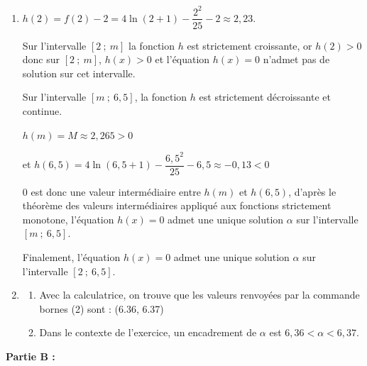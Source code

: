 \begin{enumerate}
$[2~;~6,5] \subset ]-1~;~x_1[$ donc $f$ est strictement croissante sur $[2~;~6,5]$.

\item $h(2) =f(2) - 2 = 4 \ln (2+1)-\dfrac{2^{2}}{25}-2 \approx 2,23$.

Sur l'intervalle $[2~;~m]$ la fonction $h$ est strictement croissante, or $h(2)>0$ donc sur $[2~;~m]$, $h(x)>0$ et l'équation $h(x)=0$ n'admet pas de solution sur cet intervalle.

Sur l'intervalle $[m~;~6,5]$, la fonction $h$ est strictement décroissante et continue.

$h(m) = M \approx 2,265 > 0$

et $h(6,5)=4 \ln (6,5+1)-\dfrac{6,5^{2}}{25} -6,5 \approx -0,13 <0$

0 est donc une valeur intermédiaire entre $h(m)$ et $h(6,5)$, 
d'après le théorème des valeurs intermédiaires appliqué aux fonctions strictement monotone, l'équation $h(x)=0$ admet une unique solution $\alpha$  sur l'intervalle $[m~;~6,5]$.

Finalement, l'équation $h(x)=0$ admet une unique solution $\alpha$ sur l'intervalle $[2~;~6,5]$.
\item
	\begin{enumerate}
		\item Avec la calculatrice, on trouve que les valeurs renvoyées par la commande bornes (2) sont : (6.36, 6.37)
		\item Dans le contexte de l'exercice, un encadrement de $\alpha$ est $6,36 < \alpha < 6,37$.
	\end{enumerate}
\end{enumerate}

\medskip

\textbf{Partie B :}

\medskip

